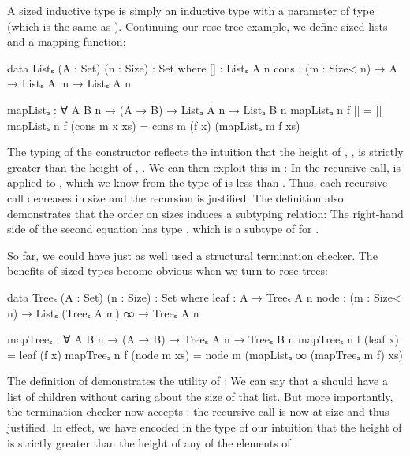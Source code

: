 A sized inductive type is simply an inductive type with a parameter of type
 (which is the same as ). Continuing our rose tree
example, we define sized lists and a mapping function:
\begin{code}
  data Listₛ (A : Set) (n : Size) : Set where
    []   : Listₛ A n
    cons : (m : Size< n) → A → Listₛ A m → Listₛ A n

  mapListₛ : ∀ {A B} n → (A → B) → Listₛ A n → Listₛ B n
  mapListₛ n f []            = []
  mapListₛ n f (cons m x xs) = cons m (f x) (mapListₛ m f xs)
\end{code}
The typing of the  constructor reflects the intuition that the
height of , , is strictly greater than the height of
, . We can then exploit this in : In the
recursive call,  is applied to , which we know from the
type of  is less than . Thus, each recursive call decreases
in size and the recursion is justified. The definition also demonstrates that
the order on sizes induces a subtyping relation: The right-hand side of the
second equation has type , which is a subtype of  for .

So far, we could have just as well used a structural termination checker. The
benefits of sized types become obvious when we turn to rose trees:
\begin{code}
  data Treeₛ (A : Set) (n : Size) : Set where
    leaf : A → Treeₛ A n
    node : (m : Size< n) → Listₛ (Treeₛ A m) ∞ → Treeₛ A n

  mapTreeₛ : ∀ {A B} n → (A → B) → Treeₛ A n → Treeₛ B n
  mapTreeₛ n f (leaf x)    = leaf (f x)
  mapTreeₛ n f (node m xs) = node m (mapListₛ ∞ (mapTreeₛ m f) xs)
\end{code}
The definition of  demonstrates the utility of : We can
say that a  should have a list of children without caring about the
size of that list. But more importantly, the termination checker now accepts
: the recursive call is now at size  and thus
justified. In effect, we have encoded in the type of  our intuition
that the height of  is strictly greater than the height of any of
the elements of .

